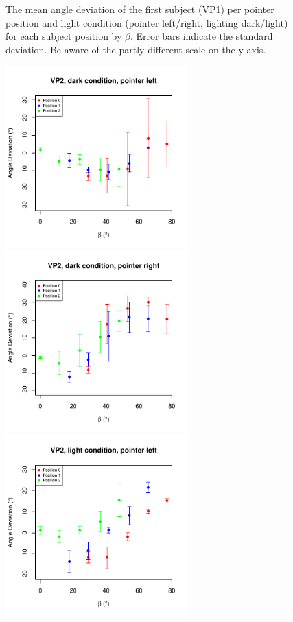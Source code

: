 \begin{figure}
    \caption{The mean angle deviation of the first subject (VP1) per pointer position and light condition (pointer left/right, lighting dark/light) for each subject position by $\beta$. Error bars indicate the standard deviation. Be aware of the partly different scale on the y-axis.} 
    \label{DeviationVP1}
\end{figure}
\begin{figure}
    \includegraphics[width = 7cm]{Images/plots/AngleDevVP2DarkLeft.pdf}
    \includegraphics[width = 7cm]{Images/plots/AngleDevVP2DarkRight.pdf}
    \includegraphics[width = 7cm]{Images/plots/AngleDevVP2LightLeft.pdf}

\end{figure}
